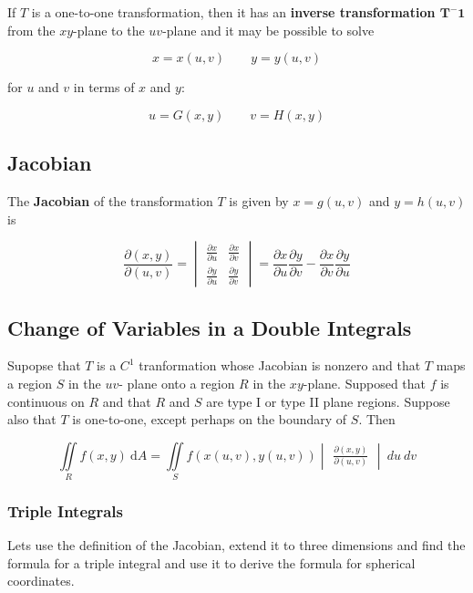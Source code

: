\documentclass{article}
\begin{document}
If $T$ is a one-to-one transformation, then it has an \textbf{inverse transformation $\mathbf{T^-1}$} from the $xy$-plane to the $uv$-plane and it may be possible to solve 

$$x = x(u,v) \qquad y = y(u,v)$$

for $u$ and $v$ in terms of $x$ and $y$:

$$u = G(x,y) \qquad v = H(x,y)$$

\subsection{Jacobian}

The \textbf{Jacobian} of the transformation $T$ is given by $x = g(u,v)$ and $y = h(u,v)$ is 


$$\frac{\partial(x,y)}{\partial(u,v)} = 
\begin{vmatrix}
    \frac{\partial x}{\partial u} & \frac{\partial x}{\partial v} \\[8pt]
    \frac{\partial y}{\partial u} & \frac{\partial y}{\partial v} 
\end{vmatrix} = \frac{\partial x}{\partial u} \frac{\partial y}{\partial v} - \frac{\partial x }{ \partial v} \frac{\partial y}{ \partial u}
$$


\subsection{Change of Variables in a Double Integrals}


Supopse that $T$ is a $C^1$ tranformation whose Jacobian is nonzero and that $T$ maps a region $S$ in the $uv$- plane onto a region $R$ in the $xy$-plane. Supposed that $f$ is continuous on $R$ and that $R$ and $S$ are type I or type II plane regions. Suppose also that $T$ is one-to-one, except perhaps on the boundary of $S$. Then 

$$\iint\limits_{R}f(x,y)\ \mathrm{d}A = \iint\limits_{S}f(x(u,v), y(u,v))\begin{vmatrix}
    \frac{\partial(x,y)}{\partial(u,v)}
\end{vmatrix} \ du \ dv$$

\subsubsection{Triple Integrals}

Lets use the definition of the Jacobian, extend it to three dimensions and find the formula for a triple integral and use it to derive the formula for spherical coordinates.
\end{document}
